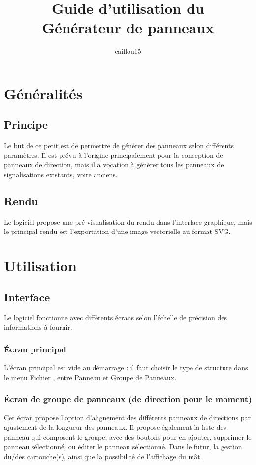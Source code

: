 \documentclass[a4paper, 12pt]{report}
\title{\textbf{Guide d'utilisation du \\Générateur de panneaux}}
\author{caillou15}
\begin{document}
	\maketitle
	\clearpage\setcounter{page}{2}
	\hypersetup{hidelinks}
	\renewcommand{\contentsname}{Sommaire}
	\tableofcontents
	
\chapter{Généralités}
\section{Principe}
Le but de ce petit est de permettre de générer des panneaux selon différents paramètres. Il est prévu à l'origine principalement pour la conception de panneaux de direction, mais il a vocation à générer tous les panneaux de signalisations existants, voire anciens.

\section{Rendu}
Le logiciel propose une pré-visualisation du rendu dans l'interface graphique, mais le principal rendu est l'exportation d'une image vectorielle au format SVG.

\chapter{Utilisation}
\section{Interface}
Le logiciel fonctionne avec différents écrans selon l'échelle de précision des informations à fournir.

\subsection{Écran principal}
L'écran principal est vide au démarrage : il faut choisir le type de structure dans le menu \og Fichier \fg, entre Panneau et Groupe de Panneaux.

\subsection{Écran de groupe de panneaux (de direction pour le moment)}
Cet écran propose l'option d'alignement des différents panneaux de directions par ajustement de la longueur des panneaux. Il propose également la liste des panneau qui composent le groupe, avec des boutons pour en ajouter, supprimer le panneau sélectionné, ou éditer le panneau sélectionné.
Dans le futur, la gestion du/des cartouche(s), ainsi que la possibilité de l'affichage du mât.
\end{document}

